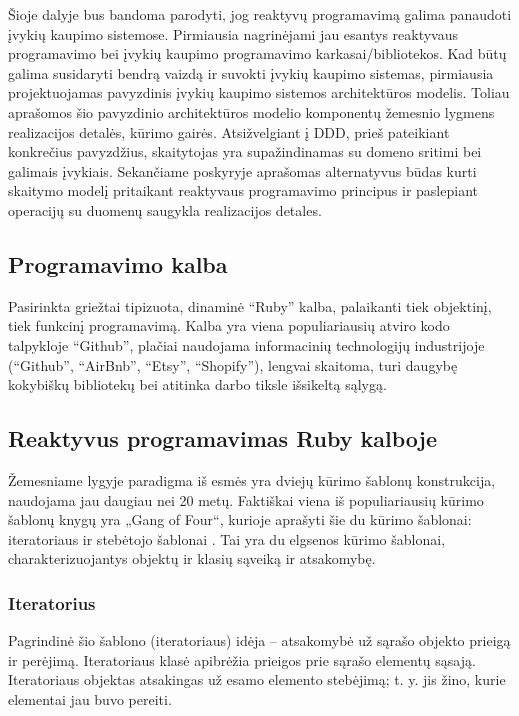 Šioje dalyje bus bandoma parodyti, jog reaktyvų programavimą galima panaudoti įvykių kaupimo sistemose. Pirmiausia nagrinėjami jau esantys reaktyvaus programavimo bei įvykių kaupimo programavimo karkasai/bibliotekos. Kad būtų galima susidaryti bendrą vaizdą ir suvokti įvykių kaupimo sistemas, pirmiausia projektuojamas pavyzdinis įvykių kaupimo sistemos architektūros modelis. Toliau aprašomos šio pavyzdinio architektūros modelio komponentų žemesnio lygmens realizacijos detalės, kūrimo gairės. Atsižvelgiant į DDD, prieš pateikiant konkrečius pavyzdžius, skaitytojas yra supažindinamas su domeno sritimi bei galimais įvykiais. Sekančiame poskyryje aprašomas alternatyvus būdas kurti skaitymo modelį pritaikant reaktyvaus programavimo principus ir paslepiant operacijų su duomenų saugykla realizacijos detales.

\subsection{Programavimo kalba}

Pasirinkta griežtai tipizuota, dinaminė ``Ruby'' kalba, palaikanti tiek objektinį, tiek funkcinį programavimą. Kalba yra viena populiariausių atviro kodo talpykloje ``Github'', plačiai naudojama informacinių technologijų industrijoje (``Github'', ``AirBnb'', ``Etsy'', ``Shopify''), lengvai skaitoma, turi daugybę kokybiškų bibliotekų bei atitinka darbo tiksle išsikeltą sąlygą.

\subsection{Reaktyvus programavimas Ruby kalboje}

Žemesniame lygyje paradigma iš esmės yra dviejų kūrimo šablonų konstrukcija, naudojama jau daugiau nei 20 metų. Faktiškai viena iš populiariausių kūrimo šablonų knygų yra „Gang of Four“, kurioje aprašyti šie du kūrimo šablonai: iteratoriaus ir stebėtojo šablonai \cite{GOF:DesignPattern}. Tai yra du elgsenos kūrimo šablonai, charakterizuojantys objektų ir klasių sąveiką ir atsakomybę.

\subsubsection{Iteratorius}

Pagrindinė šio šablono (iteratoriaus) idėja – atsakomybė už sąrašo objekto prieigą ir perėjimą. Iteratoriaus klasė apibrėžia prieigos prie sąrašo elementų sąsają. Iteratoriaus objektas atsakingas už esamo elemento stebėjimą; t. y. jis žino, kurie elementai jau buvo pereiti.


